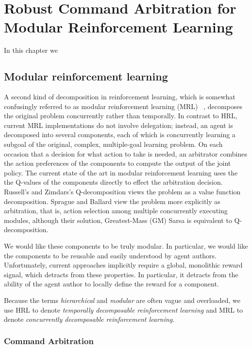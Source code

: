 \chapter{Robust Command Arbitration for Modular Reinforcement Learning}\label{ch:arbiq}

In this chapter we

\section{Modular reinforcement learning}

A second kind of decomposition in reinforcement learning, which is somewhat confusingly referred to as modular reinforcement learning (MRL) ~\cite{russell2003q-decomposition,sprague2003multiple-goal}, decomposes the original problem concurrently rather than temporally. In contrast to HRL, current MRL implementations do not involve delegation; instead, an agent is decomposed into several components, each of which is concurrently learning a subgoal of the original, complex, multiple-goal learning problem. On each occasion that a decision for what action to take is needed, an arbitrator combines the action preferences of the components to compute the output of the joint policy.  The current state of the art in modular reinforcement learning uses the the Q-values of the components directly to effect the arbitration decision.  Russell's and Zimdars's Q-decomposition \cite{russell2003q-decomposition} views the problem as a value function decomposition.  Sprague and Ballard view the problem more explicitly as arbitration, that is, action selection among multiple concurrently executing modules, although their solution, Greatest-Mass (GM) Sarsa \cite{sprague2003multiple-goal} is equivalent to Q-decomposition.

We would like these components to be truly modular. In particular, we would like the components to be reusable and easily understood by agent authors.  Unfortunately, current approaches implicitly require a global, monolithic reward signal, which detracts from these properties.  In particular, it detracts from the ability of the agent author to locally define the reward for a component.

Because the terms {\em hierarchical} and {\em modular} are often vague and overloaded, we use HRL to denote {\em temporally decomposable
  reinforcement learning} and MRL to denote {\em concurrently
  decomposable reinforcement learning}.

\subsection{Command Arbitration}

